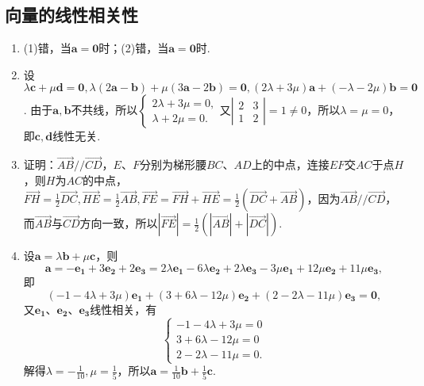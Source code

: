 \documentclass[UTF8]{ctexart}
\begin{document}
\subsection{向量的线性相关性}
\begin{enumerate}
\item (1)错，当$\mathbf{a}=\mathbf{0}$时；(2)错，当$\mathbf{a}=\mathbf{0}$时.
\item 设$\lambda\mathbf{c}+\mu\mathbf{d}=\mathbf{0},\lambda(2\mathbf{a}-\mathbf{b})+\mu(3\mathbf{a}-2\mathbf{b})=\mathbf{0},(2\lambda+3\mu)\mathbf{a}+(-\lambda-2\mu)\mathbf{b}=\mathbf{0}$. 由于$\mathbf{a},\mathbf{b}$不共线，所以$\left\{\begin{array}{ll}2\lambda+3\mu=0,\\ \lambda+2\mu=0.\end{array}\right.$又$\left|\begin{array}{cc}2&3\\1&2\end{array}\right|=1\neq0$，所以$\lambda=\mu=0$，即$\mathbf{c},\mathbf{d}$线性无关. 
\item 证明：$\overrightarrow{AB}//\overrightarrow{CD}$，$E$、$F$分别为梯形腰$BC$、$AD$上的中点，连接$EF$交$AC$于点$H$，则$H$为$AC$的中点，$\overrightarrow{FH}=\displaystyle\frac{1}{2}\overrightarrow{DC},\overrightarrow{HE}=\displaystyle\frac{1}{2}\overrightarrow{AB},\overrightarrow{FE}=\overrightarrow{FH}+\overrightarrow{HE}=\displaystyle\frac{1}{2}\left(\overrightarrow{DC}+\overrightarrow{AB}\right)$，因为$\overrightarrow{AB}//\overrightarrow{CD}$，而$\overrightarrow{AB}$与$\overrightarrow{CD}$方向一致，所以$\left|\overrightarrow{FE}\right|=\displaystyle\frac{1}{2}\left(\left|\overrightarrow{AB}\right|+\left|\overrightarrow{DC}\right|\right)$.

\item 设$\mathbf{a}=\lambda\mathbf{b}+\mu\mathbf{c}$，则$$\mathbf{a}=-\mathbf{e_1}+3\mathbf{e_2}+2\mathbf{e_3}=2\lambda\mathbf{e_1}-6\lambda\mathbf{e_2}+2\lambda\mathbf{e_3}-3\mu\mathbf{e_1}+12\mu\mathbf{e_2}+11\mu\mathbf{e_3},$$即$$\left(-1-4\lambda+3\mu\right)\mathbf{e_1}+\left(3+6\lambda-12\mu\right)\mathbf{e_2}+\left(2-2\lambda-11\mu\right)\mathbf{e_3}=\mathbf{0},$$又$\mathbf{e_1}$、$\mathbf{e_2}$、$\mathbf{e_3}$线性相关，有$$\left\{\begin{array}{lll}-1-4\lambda+3\mu=0\\ 3+6\lambda-12\mu=0\\ 2-2\lambda-11\mu=0. \end{array}\right.$$解得$\lambda=-\displaystyle\frac{1}{10},\mu=\displaystyle\frac{1}{5}$，所以$\mathbf{a}=\displaystyle\frac{1}{10}\mathbf{b}+\displaystyle\frac{1}{5}\mathbf{c}$.


\end{enumerate}
\end{document}
